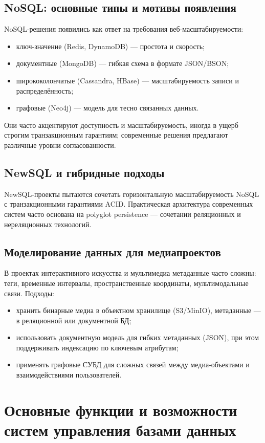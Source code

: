 \documentclass[14pt,a4paper]{extarticle}
\begin{document}
\subsection{NoSQL: основные типы и мотивы появления}
NoSQL-решения появились как ответ на требования веб-масштабируемости:
\begin{itemize}
  \item ключ-значение (Redis, DynamoDB) — простота и скорость;
  \item документные (MongoDB) — гибкая схема в формате JSON/BSON;
  \item ширококолончатые (Cassandra, HBase) — масштабируемость записи и распределённость;
  \item графовые (Neo4j) — модель для тесно связанных данных.
\end{itemize}
Они часто акцентируют доступность и масштабируемость, иногда в ущерб строгим транзакционным гарантиям; современные решения предлагают различные уровни согласованности.

\subsection{NewSQL и гибридные подходы}
NewSQL-проекты пытаются сочетать горизонтальную масштабируемость NoSQL с транзакционными гарантиями ACID. Практическая архитектура современных систем часто основана на polyglot persistence — сочетании реляционных и нереляционных технологий.

\subsection{Моделирование данных для медиапроектов}
В проектах интерактивного искусства и мультимедиа метаданные часто сложны: теги, временные интервалы, пространственные координаты, мультимодальные связи. Подходы:
\begin{itemize}
  \item хранить бинарные медиа в объектном хранилище (S3/MinIO), метаданные — в реляционной или документной БД;
  \item использовать документную модель для гибких метаданных (JSON), при этом поддерживать индексацию по ключевым атрибутам;
  \item применять графовые СУБД для сложных связей между медиа-объектами и взаимодействиями пользователей.
\end{itemize}

\section{Основные функции и возможности систем управления базами данных}
\end{document}
